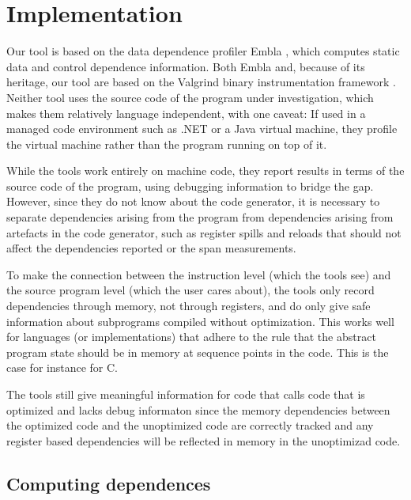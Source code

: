 \section{Implementation}

Our tool is based on the data dependence profiler Embla \cite{embla:08},
which computes static data and control dependence information.  Both Embla
and, because of its heritage, our tool are based on the Valgrind binary
instrumentation framework \cite{valgrind:07}. Neither tool uses the 
source code of the program under investigation, which makes them 
relatively language independent, with one caveat: If used in a managed
code environment such as .NET or a Java virtual machine, they profile the
virtual machine rather than the program running on top of it.

While the tools work entirely on machine code, they report results in terms 
of the source code of the program, using debugging information to bridge
the gap. However, since they do not know about the code generator, it is 
necessary to separate dependencies arising from the program from 
dependencies arising from artefacts in the code generator, such as 
register spills and reloads that should not affect the dependencies 
reported or the span measurements. 

To make the connection between the 
instruction level (which the tools see) and the source program level 
(which the user cares about), the tools only record dependencies through 
memory, not through registers, and do only give safe information about 
subprograms compiled without optimization. This works well for languages 
(or implementations) that adhere to the rule that the abstract program 
state should be in memory at sequence points in the code. This is the 
case for instance for C. 

The tools still give meaningful information for code that calls code 
that is optimized and lacks debug informaton since the memory dependencies
between the optimized code and the unoptimized code are correctly tracked
and any register based dependencies will be reflected in memory in the
unoptimizad code.


\subsection{Computing dependences}   \label{snca}

